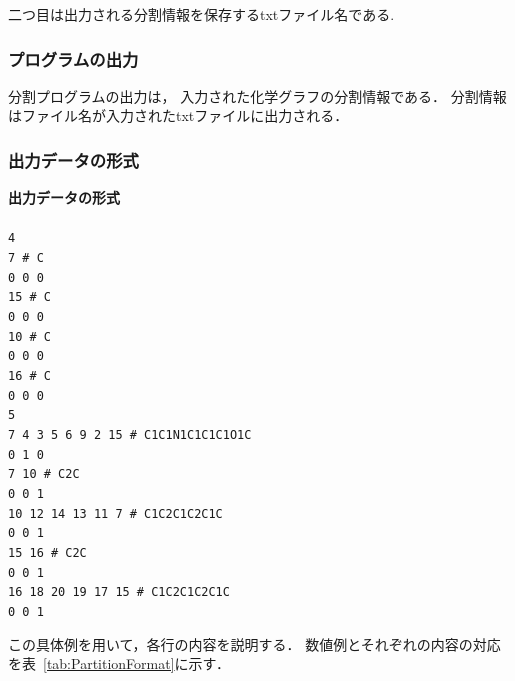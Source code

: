 \documentclass[11pt,titlepage,dvipdfmx,twoside]{jsbook}
\begin{document}
二つ目は出力される分割情報を保存するtxtファイル名である.
\bigskip

\subsubsection{プログラムの出力}
\label{chap:Output_p}

分割プログラムの出力は，
入力された化学グラフの分割情報である．
分割情報はファイル名が入力されたtxtファイルに出力される．

\subsubsection{出力データの形式}
\label{chap:OutputFormat_p}

\begin{oframed}
	{\bf 出力データの形式}\\\\
	{\tt 4 \\
	7 \# C \\
	0 0 0 \\
	15 \# C \\
	0 0 0 \\
	10 \# C \\
	0 0 0 \\
	16 \# C \\
	0 0 0 \\
	5 \\
	7 4 3 5 6 9 2 15 \# C1C1N1C1C1C1O1C \\
	0 1 0 \\
	7 10 \# C2C \\
	0 0 1 \\
	10 12 14 13 11 7 \# C1C2C1C2C1C \\
	0 0 1 \\
	15 16 \# C2C \\
	0 0 1 \\
	16 18 20 19 17 15 \# C1C2C1C2C1C \\
	0 0 1 \\}
	\end{oframed}

	この具体例を用いて，各行の内容を説明する．
	数値例とそれぞれの内容の対応を表~\ref{tab:PartitionFormat}に示す．
\end{document}

